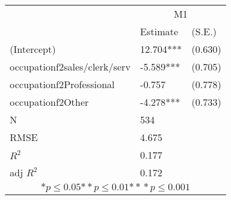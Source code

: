 \begin{tabular}{*{3}{l}}
\hline
                  & \multicolumn{2}{c}{M1}   \tabularnewline
                   &Estimate  &(S.E.)  \tabularnewline
 \hline
 \hline
   (Intercept)     &12.704***   &   (0.630) \tabularnewline
   occupationf2sales/clerk/serv    &-5.589***   &   (0.705) \tabularnewline
   occupationf2Professional    &-0.757   &   (0.778) \tabularnewline
   occupationf2Other    &-4.278***   &   (0.733) \tabularnewline
 \hline
 N                 &534       &        \tabularnewline
 RMSE             &4.675         & \tabularnewline
 $R^2$             &0.177         & \tabularnewline
 adj $R^2$         &0.172         & \tabularnewline
 \hline
\hline
 
 \multicolumn{3}{c}{${*  p}\le 0.05$${*\!\!*  p}\le 0.01$${*\!\!*\!\!*  p}\le 0.001$}\tabularnewline
 \end{tabular}